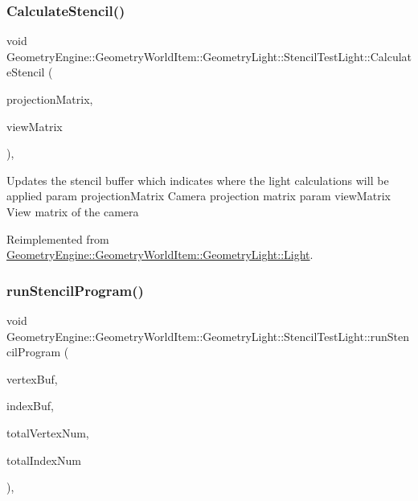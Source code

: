 \subsubsection{\texorpdfstring{CalculateStencil()}{CalculateStencil()}}
{\footnotesize\ttfamily void Geometry\+Engine\+::\+Geometry\+World\+Item\+::\+Geometry\+Light\+::\+Stencil\+Test\+Light\+::\+Calculate\+Stencil (\begin{DoxyParamCaption}\item[{const Q\+Matrix4x4 \&}]{projection\+Matrix,  }\item[{const Q\+Matrix4x4 \&}]{view\+Matrix }\end{DoxyParamCaption})\hspace{0.3cm}{\ttfamily [override]}, {\ttfamily [virtual]}}

Updates the stencil buffer which indicates where the light calculations will be applied param projection\+Matrix Camera projection matrix param view\+Matrix View matrix of the camera 

Reimplemented from \mbox{\hyperlink{class_geometry_engine_1_1_geometry_world_item_1_1_geometry_light_1_1_light_ae50fab4782158671041ac986dfead7fc}{Geometry\+Engine\+::\+Geometry\+World\+Item\+::\+Geometry\+Light\+::\+Light}}.

\mbox{\label{class_geometry_engine_1_1_geometry_world_item_1_1_geometry_light_1_1_stencil_test_light_a619546f72b149132ea11a28796d307ff}} 
\subsubsection{\texorpdfstring{runStencilProgram()}{runStencilProgram()}}
{\footnotesize\ttfamily void Geometry\+Engine\+::\+Geometry\+World\+Item\+::\+Geometry\+Light\+::\+Stencil\+Test\+Light\+::run\+Stencil\+Program (\begin{DoxyParamCaption}\item[{Q\+Open\+G\+L\+Buffer $\ast$}]{vertex\+Buf,  }\item[{Q\+Open\+G\+L\+Buffer $\ast$}]{index\+Buf,  }\item[{unsigned int}]{total\+Vertex\+Num,  }\item[{unsigned int}]{total\+Index\+Num }\end{DoxyParamCaption})\hspace{0.3cm}{\ttfamily [protected]}, {\ttfamily [virtual]}}

